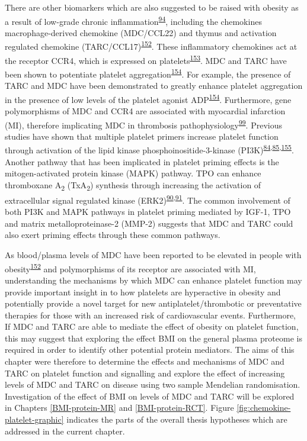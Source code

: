 \documentclass[11pt,twoside]{bristolthesis}
\begin{document}
There are other biomarkers which are also suggested to be raised with obesity as a result of low-grade chronic inflammation\textsuperscript{\protect\hyperlink{ref-Esser2014}{94}}, including the chemokines macrophage-derived chemokine (MDC/CCL22) and thymus and activation regulated chemokine (TARC/CCL17)\textsuperscript{\protect\hyperlink{ref-Safa2016}{152}}. These inflammatory chemokines act at the receptor CCR4, which is expressed on platelets\textsuperscript{\protect\hyperlink{ref-Clemetson2000}{153}}. MDC and TARC have been shown to potentiate platelet aggregation\textsuperscript{\protect\hyperlink{ref-Gear2001}{154}}. For example, the presence of TARC and MDC have been demonstrated to greatly enhance platelet aggregation in the presence of low levels of the platelet agonist ADP\textsuperscript{\protect\hyperlink{ref-Gear2001}{154}}. Furthermore, gene polymorphisms of MDC and CCR4 are associated with myocardial infarction (MI), therefore implicating MDC in thrombosis pathophysiology\textsuperscript{\protect\hyperlink{ref-Noori2018}{99}}. Previous studies have shown that multiple platelet primers increase platelet function through activation of the lipid kinase phosphoinositide-3-kinase (PI3K)\textsuperscript{\protect\hyperlink{ref-Blair2015}{84},\protect\hyperlink{ref-Pasquet2000}{85},\protect\hyperlink{ref-Falcinelli2005}{155}}. Another pathway that has been implicated in platelet priming effects is the mitogen-activated protein kinase (MAPK) pathway. TPO can enhance thromboxane A\textsubscript{2} (TxA\textsubscript{2}) synthesis through increasing the activation of extracellular signal regulated kinase (ERK2)\textsuperscript{\protect\hyperlink{ref-Ezumi1998}{90},\protect\hyperlink{ref-VanWilligen2000}{91}}. The common involvement of both PI3K and MAPK pathways in platelet priming mediated by IGF-1, TPO and matrix metalloproteinase-2 (MMP-2) suggests that MDC and TARC could also exert priming effects through these common pathways.

As blood/plasma levels of MDC have been reported to be elevated in people with obesity\textsuperscript{\protect\hyperlink{ref-Safa2016}{152}} and polymorphisms of its receptor are associated with MI, understanding the mechanisms by which MDC can enhance platelet function may provide important insight in to how platelets are hyperactive in obesity and potentially provide a novel target for new antiplatelet/thrombotic or preventative therapies for those with an increased risk of cardiovascular events. Furthermore, If MDC and TARC are able to mediate the effect of obesity on platelet function, this may suggest that exploring the effect BMI on the general plasma proteome is required in order to identify other potential protein mediators. The aims of this chapter were therefore to determine the effects and mechanisms of MDC and TARC on platelet function and signalling and explore the effect of increasing levels of MDC and TARC on disease using two sample Mendelian randomisation. Investigation of the effect of BMI on levels of MDC and TARC will be explored in Chapters \ref{BMI-protein-MR} and \ref{BMI-protein-RCT}. Figure \ref{fig:chemokine-platelet-graphic} indicates the parts of the overall thesis hypotheses which are addressed in the current chapter.
\end{document}
